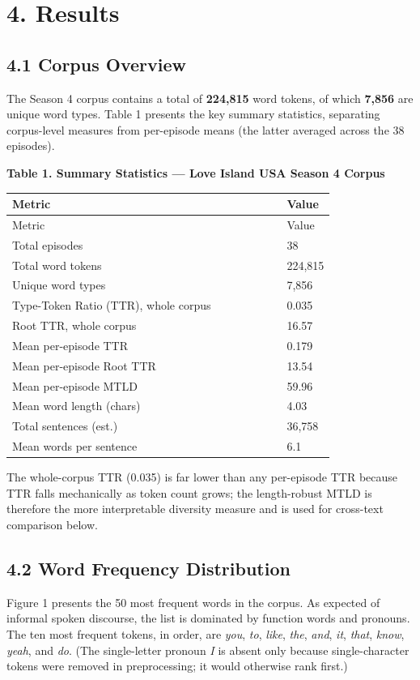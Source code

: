 \documentclass[11pt]{article}
\begin{document}
\section*{4. Results}

\subsection*{4.1 Corpus Overview}

The Season 4 corpus contains a total of \textbf{224,815} word tokens, of which \textbf{7,856} are unique word types. Table 1 presents the key summary statistics, separating corpus-level measures from per-episode means (the latter averaged across the 38 episodes).

\textbf{Table 1. Summary Statistics --- Love Island USA Season 4 Corpus}

\begin{longtable}{p{0.85\linewidth}l}
\toprule
Metric & Value \\
\midrule
\endfirsthead
\toprule
Metric & Value \\
\midrule
\endhead
\bottomrule
\endlastfoot
Total episodes & 38 \\
Total word tokens & 224,815 \\
Unique word types & 7,856 \\
Type-Token Ratio (TTR), whole corpus & 0.035 \\
Root TTR, whole corpus & 16.57 \\
Mean per-episode TTR & 0.179 \\
Mean per-episode Root TTR & 13.54 \\
Mean per-episode MTLD & 59.96 \\
Mean word length (chars) & 4.03 \\
Total sentences (est.) & 36,758 \\
Mean words per sentence & 6.1 \\
\end{longtable}

The whole-corpus TTR (0.035) is far lower than any per-episode TTR because TTR falls mechanically as token count grows; the length-robust MTLD is therefore the more interpretable diversity measure and is used for cross-text comparison below.

\subsection*{4.2 Word Frequency Distribution}

Figure 1 presents the 50 most frequent words in the corpus. As expected of informal spoken discourse, the list is dominated by function words and pronouns. The ten most frequent tokens, in order, are \emph{you}, \emph{to}, \emph{like}, \emph{the}, \emph{and}, \emph{it}, \emph{that}, \emph{know}, \emph{yeah}, and \emph{do}. (The single-letter pronoun \emph{I} is absent only because single-character tokens were removed in preprocessing; it would otherwise rank first.)
\end{document}
